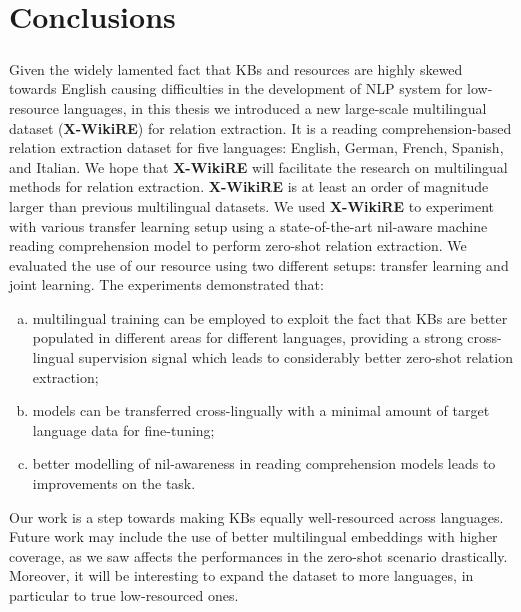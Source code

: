 \chapter{Conclusions}
\label{chpt:7}
\paragraph{}
Given the widely lamented fact that KBs and resources are highly skewed towards English causing difficulties in the development of NLP system for low-resource languages, in this thesis we introduced a new large-scale multilingual dataset (\textbf{X-WikiRE}) for relation extraction. It is a reading comprehension-based relation extraction dataset for five languages: English, German, French, Spanish, and Italian. We hope that \textbf{X-WikiRE} will facilitate the research on multilingual methods for relation extraction. \textbf{X-WikiRE} is at least an order of magnitude larger than previous multilingual datasets. We used \textbf{X-WikiRE} to  experiment with various transfer learning setup using a state-of-the-art nil-aware machine reading comprehension model to perform zero-shot relation extraction. We evaluated the use of our resource using two different setups: transfer learning and joint learning. The experiments demonstrated that: \begin{enumerate}[a) , font=\bfseries, noitemsep]
    \item  multilingual training can be employed to exploit the fact that KBs are better populated in different areas for different languages, providing a strong cross-lingual supervision signal which leads to considerably better zero-shot relation extraction;
    \item models can be transferred cross-lingually with a minimal amount of target language data for fine-tuning;
    \item better modelling of nil-awareness in reading comprehension models leads to improvements on the task.
\end{enumerate}

Our work is a step towards making KBs equally well-resourced across languages. Future work may include the use of better multilingual embeddings with higher coverage, as we saw affects the performances in the zero-shot scenario drastically. Moreover, it will be interesting to expand the dataset to more languages, in particular to true low-resourced ones. 


